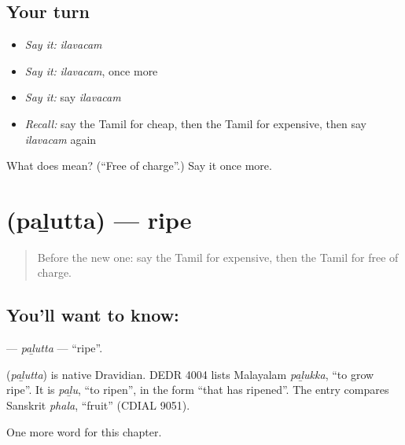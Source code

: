 \subsection*{Your turn}
\begin{itemize}
\raggedright
  \item \emph{Say it:} \emph{ilavacam}
  \item \emph{Say it:} \emph{ilavacam}, once more
  \item \emph{Say it:} say \emph{ilavacam}
  \item \emph{Recall:} say the Tamil for cheap, then the Tamil for expensive, then say \emph{ilavacam} again
\end{itemize}

\begin{tcolorbox}[breakable,colback=teal!4,colframe=teal!35!black,title={Before you move on}]
What does  mean? (\textquotedblleft{}Free of charge\textquotedblright{}.) Say it once more.
\end{tcolorbox}
\section[\texorpdfstring{\ta{பழுத்த} (paḻutta)}{பழுத்த (paḻutta)}]{ (paḻutta) — ripe}

\label{lesson:TA-C178-palutta}



\begin{quote}
Before the new one: say the Tamil for expensive, then the Tamil for free of charge.
\end{quote}

\subsection*{You'll want to know: }
\textbf{} — \emph{paḻutta} — \textquotedblleft{}ripe\textquotedblright{}.

\begin{cousinweb}
\textbf{} (\emph{paḻutta}) is native Dravidian. DEDR 4004 lists Malayalam \emph{paḻukka}, \textquotedblleft{}to grow ripe\textquotedblright{}. It is \emph{paḻu}, \textquotedblleft{}to ripen\textquotedblright{}, in the form \textquotedblleft{}that has ripened\textquotedblright{}. The entry compares Sanskrit \emph{phala}, \textquotedblleft{}fruit\textquotedblright{} (CDIAL 9051).
\end{cousinweb}

\begin{grammarlens}[title={What you've built}]
One more word for this chapter.
\end{grammarlens}

